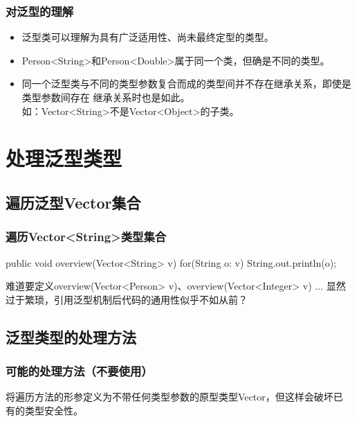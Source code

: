 \subsubsection{对泛型的理解}
  
\begin{itemize}
\item 泛型类可以理解为具有广泛适用性、尚未最终定型的类型。
\item Person<String>和Person<Double>属于同一个类，但确是不同的类型。
\item 同一个泛型类与不同的类型参数复合而成的类型间并不存在继承关系，即使是类型参数间存在
  继承关系时也是如此。\\
  {\kai 如：Vector<String>不是Vector<Object>的子类。}
\end{itemize}

\section{处理泛型类型}

\subsection{遍历泛型Vector集合}

\subsubsection{遍历Vector<String>类型集合}
  
\begin{javaCode}
  public void overview(Vector<String> v) {
    for(String o: v) {
      String.out.println(o);
    }
  }
\end{javaCode}


难道要定义overview(Vector<Person> v)、overview(Vector<Integer> v)
... 显然过于繁琐，引用泛型机制后代码的通用性似乎不如从前？

\subsection{泛型类型的处理方法}

\subsubsection{可能的处理方法（不要使用）}

将遍历方法的形参定义为不带任何类型参数的原型类型Vector，但这样会破坏已
有的类型安全性。

